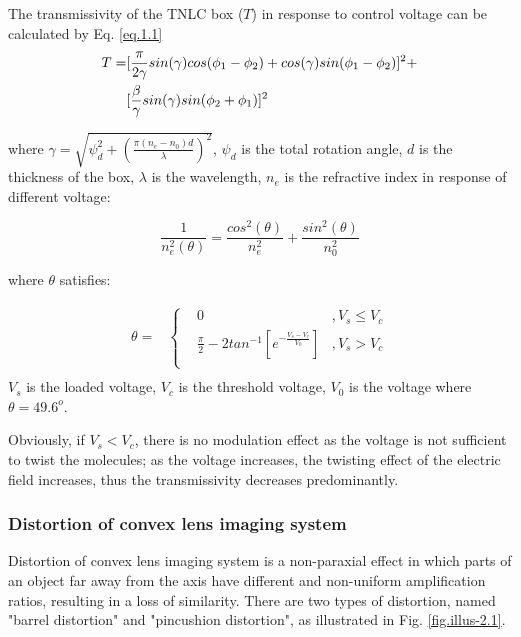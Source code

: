 \documentclass[10pt,a4paper,twocolumn,twoside,UTF8]{article}
\begin{document}
		The transmissivity of the TNLC box ($T$) in response to control voltage can be calculated by Eq. \ref{eq.1.1}
		\begin{align}
			T = &[\frac{\pi}{2\gamma}sin(\gamma)cos(\phi_1-\phi_2)+cos(\gamma)sin(\phi_1-\phi_2)]^2 + \notag\\
				&[\frac{\beta}{\gamma}sin(\gamma)sin(\phi_2+\phi_1)]^2 
			\label{eq.1.1}
		\end{align}
		
		where $\gamma = \sqrt{\psi_d^2 + (\frac{\pi(n_e-n_0)d}{\lambda})^2}$, $\psi_d$ is the total rotation angle, $d$ is the thickness of the box, $\lambda$ is the wavelength, $n_e$ is the refractive index in response of different voltage:

		\begin{equation}
			\frac{1}{n_e^2(\theta)} = \frac{cos^2(\theta)}{n_e^2} + \frac{sin^2(\theta)}{n_0^2}
			\label{eq.1.2}
		\end{equation}
		
		where $\theta$ satisfies:

		\begin{align}
			\theta =
			&\left\{
				\begin{aligned}
					&0 &,V_s \le V_c \\
					&\frac{\pi}{2} - 2tan^{-1}[e^{-\frac{V_s - V_c}{V_0}}] &,V_s > V_c \\
				\end{aligned}
			\right. \\
			\label{eq.1.3}
		\end{align}
		$V_s$ is the loaded voltage, $V_c$ is the threshold voltage, $V_0$ is the voltage where $\theta = 49.6^o$.
		
		Obviously, if $V_s < V_c$, there is no modulation effect as the voltage is not sufficient to twist the molecules; as the voltage increases, the twisting effect of the electric field increases, thus the transmissivity decreases predominantly.
		
		
		\subsubsection{Distortion of convex lens imaging system}
		Distortion of convex lens imaging system is a non-paraxial effect in which parts of an object far away from the axis have different and non-uniform amplification ratios, resulting in a loss of similarity. 
		There are two types of distortion, named "barrel distortion" and "pincushion distortion", as illustrated in Fig. \ref{fig.illus-2.1}.
\end{document}
